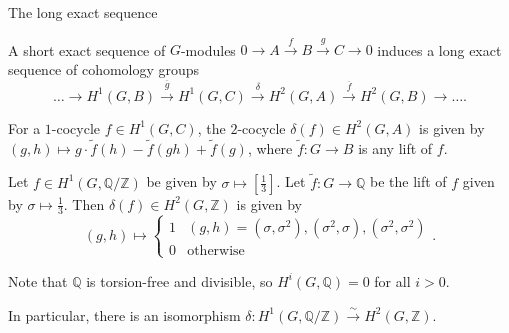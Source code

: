 \documentclass[10pt]{beamer}
\begin{document}
\begin{frame}[t]{The long exact sequence}

A short exact sequence of $ G $-modules $ 0 \to A \xrightarrow{f} B \xrightarrow{g} C \to 0 $ induces a long exact sequence of cohomology groups
$$ \dots \to H^1(G, B) \xrightarrow{\overline{g}} H^1(G, C) \xrightarrow{\delta} H^2(G, A) \xrightarrow{\overline{f}} H^2(G, B) \to \dots. $$

\pause

For a $ 1 $-cocycle $ f \in H^1(G, C) $, the $ 2 $-cocycle $ \delta(f) \in H^2(G, A) $ is given by $ (g, h) \mapsto g \cdot \widetilde{f}(h) - \widetilde{f}(gh) + \widetilde{f}(g) $, where $ \widetilde{f} : G \to B $ is any lift of $ f $.

\pause

\begin{example}[$ G = \{1, \sigma, \sigma^2\} $ trivial on $ 0 \to \mathbb{Z} \xrightarrow{\iota} \mathbb{Q} \to \mathbb{Q} / \mathbb{Z} \to 0 $]

\pause

Let $ f \in H^1(G, \mathbb{Q} / \mathbb{Z}) $ be given by $ \sigma \mapsto [\tfrac{1}{3}] $. \pause Let $ \widetilde{f} : G \to \mathbb{Q} $ be the lift of $ f $ given by $ \sigma \mapsto \tfrac{1}{3} $. \pause Then $ \delta(f) \in H^2(G, \mathbb{Z}) $ is given by
$$ (g, h) \mapsto \begin{cases} 1 & (g, h) = (\sigma, \sigma^2), (\sigma^2, \sigma), (\sigma^2, \sigma^2) \\ 0 & \text{otherwise} \end{cases}. $$

\pause

Note that $ \mathbb{Q} $ is torsion-free and divisible, so $ H^i(G, \mathbb{Q}) = 0 $ for all $ i > 0 $.

In particular, there is an isomorphism $ \delta : H^1(G, \mathbb{Q} / \mathbb{Z}) \xrightarrow{\sim} H^2(G, \mathbb{Z}) $.
\end{example}

\end{frame}
\end{document}
